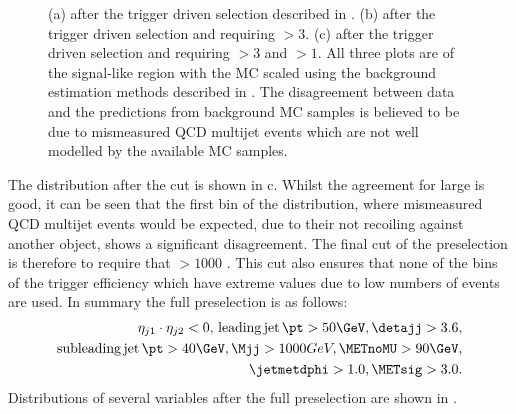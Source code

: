 \begin{figure}
  \caption{(a) \METsig after the trigger driven selection described in . (b) \jetmetdphi after the trigger driven selection and requiring \METsig$>3$. (c) \Mjj after the trigger driven selection and requiring \METsig$>3$ and \jetmetdphi$>1$. All three plots are of the signal-like region with the \ac{MC} scaled using the background estimation methods described in . The disagreement between data and the predictions from background \ac{MC} samples is believed to be due to mismeasured \ac{QCD} multijet events which are not well modelled by the available \ac{MC} samples.}
  \label{fig:parkedpresel}
\end{figure}

The \Mjj distribution after the \jetmetdphi cut is shown in c. Whilst the agreement for large \Mjj is good, it can be seen that the first bin of the distribution, where mismeasured \ac{QCD} multijet events would be expected, due to their not recoiling against another object, shows a significant disagreement. The final cut of the preselection is therefore to require that \Mjj$>1000$ \GeV. This cut also ensures that none of the bins of the trigger efficiency which have extreme values due to low numbers of events are used. In summary the full preselection is as follows:
\begin{equation}
  \label{eq:presel}
  \begin{split}
  \eta_{j1}\cdot\eta_{j2}<0,\,\mathrm{leading\,jet\,}\pt>50 \GeV, \detajj>3.6, \\
  \mathrm{subleading\,jet\,}\pt>40 \GeV, \Mjj>1000 GeV, \METnoMU>90\GeV, \\
  \jetmetdphi>1.0, \METsig>3.0.
  \end{split}
\end{equation}
Distributions of several variables after the full preselection are shown in .

